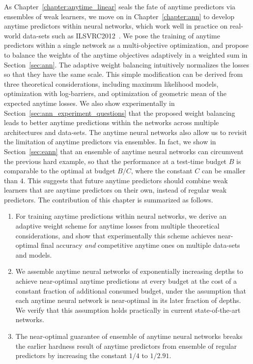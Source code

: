 As Chapter~\ref{chapter:anytime_linear} seals the fate of anytime predictors via ensembles of weak learners, we move on in Chapter~\ref{chapter:ann} to develop anytime predictors within neural networks, which work well in practice on real-world data-sets such as ILSVRC2012~\citep{ILSVRC15}. We pose the training of anytime predictors within a single network as a multi-objective optimization, and propose to balance the weights of the anytime objectives adaptively in a weighted sum in Section~\ref{sec:ann}. The adaptive weight balancing intuitively normalizes the losses so that they have the same scale. This simple modification can be derived from three theoretical considerations, including maximum likelihood models, optimization with log-barriers, and optimization of geometric mean of the expected anytime losses. We also show experimentally in Section~\ref{sec:ann_experiment_questions} that the proposed weight balancing leads to better anytime predictions within the networks across multiple architectures and data-sets. The anytime neural networks also allow us to revisit the limitation of anytime predictors via ensembles. In fact, we show in Section~\ref{sec:eann} that an ensemble of anytime neural networks can circumvent the previous hard example, so that the performance at a test-time budget $B$ is comparable to the optimal at budget $B/C$, where the constant $C$ can be smaller than $4$. This suggests that future anytime predictors should combine weak learners that are anytime predictors on their own, instead of regular weak predictors.
The contribution of this chapter is summarized as follows.

\begin{enumerate}[resume]
\item For training anytime predictions within neural networks, we derive an adaptive weight scheme for anytime losses from multiple theoretical considerations, and show that experimentally this scheme achieves near-optimal final accuracy \emph{and} competitive anytime ones on multiple data-sets and models.
\item We assemble anytime neural networks of exponentially increasing depths to achieve near-optimal anytime predictions at every budget at the cost of a constant fraction of additional consumed budget, under the assumption that each anytime neural network is near-optimal in its later fraction of depths. We verify that this assumption holds practically in current state-of-the-art networks.
\item The near-optimal guarantee of ensemble of anytime neural networks breaks the earlier hardness result of anytime predictors from ensemble of regular predictors by increasing the constant $1/4$ to $1/2.91$.
\end{enumerate}

